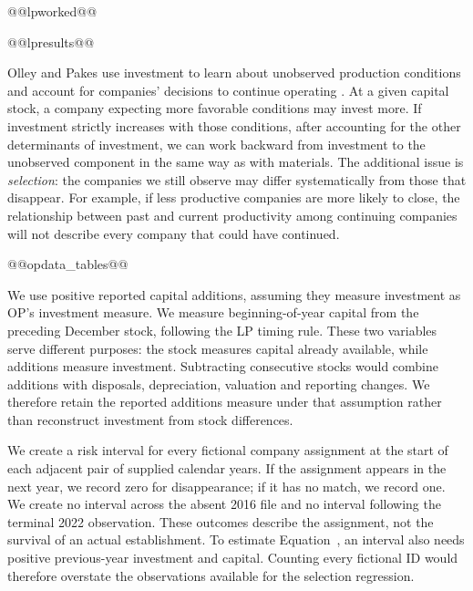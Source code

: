@@lpworked@@

@@lpresults@@

Olley and Pakes use investment to learn about unobserved production conditions and account for companies' decisions to continue operating \citep{op}. At a given capital stock, a company expecting more favorable conditions may invest more. If investment strictly increases with those conditions, after accounting for the other determinants of investment, we can work backward from investment to the unobserved component in the same way as with materials. The additional issue is \emph{selection}: the companies we still observe may differ systematically from those that disappear. For example, if less productive companies are more likely to close, the relationship between past and current productivity among continuing companies will not describe every company that could have continued.

@@opdata_tables@@

We use positive reported capital additions, assuming they measure investment as OP's investment measure. We measure beginning-of-year capital from the preceding December stock, following the LP timing rule. These two variables serve different purposes: the stock measures capital already available, while additions measure investment. Subtracting consecutive stocks would combine additions with disposals, depreciation, valuation and reporting changes. We therefore retain the reported additions measure under that assumption rather than reconstruct investment from stock differences.

We create a risk interval for every fictional company assignment at the start of each adjacent pair of supplied calendar years. If the assignment appears in the next year, we record zero for disappearance; if it has no match, we record one. We create no interval across the absent 2016 file and no interval following the terminal 2022 observation. These outcomes describe the assignment, not the survival of an actual establishment. To estimate Equation~, an interval also needs positive previous-year investment and capital. Counting every fictional ID would therefore overstate the observations available for the selection regression.

